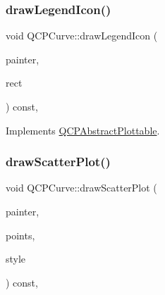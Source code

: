 \mbox{\label{class_q_c_p_curve_aac6e94afbce4002d2cd7793250154e84}} 
\subsubsection{\texorpdfstring{drawLegendIcon()}{drawLegendIcon()}}
{\footnotesize\ttfamily void Q\+C\+P\+Curve\+::draw\+Legend\+Icon (\begin{DoxyParamCaption}\item[{\mbox{\hyperlink{class_q_c_p_painter}{Q\+C\+P\+Painter}} $\ast$}]{painter,  }\item[{const Q\+RectF \&}]{rect }\end{DoxyParamCaption}) const\hspace{0.3cm}{\ttfamily [protected]}, {\ttfamily [virtual]}}



Implements \mbox{\hyperlink{class_q_c_p_abstract_plottable_a9a450783fd9ed539e589999fd390cdf7}{Q\+C\+P\+Abstract\+Plottable}}.

\mbox{\label{class_q_c_p_curve_a0bea811373c5ee8c67c9c2b4d74ad866}} 
\subsubsection{\texorpdfstring{drawScatterPlot()}{drawScatterPlot()}}
{\footnotesize\ttfamily void Q\+C\+P\+Curve\+::draw\+Scatter\+Plot (\begin{DoxyParamCaption}\item[{\mbox{\hyperlink{class_q_c_p_painter}{Q\+C\+P\+Painter}} $\ast$}]{painter,  }\item[{const Q\+Vector$<$ Q\+PointF $>$ \&}]{points,  }\item[{const \mbox{\hyperlink{class_q_c_p_scatter_style}{Q\+C\+P\+Scatter\+Style}} \&}]{style }\end{DoxyParamCaption}) const\hspace{0.3cm}{\ttfamily [protected]}, {\ttfamily [virtual]}}

\mbox{\label{class_q_c_p_curve_aefca1e5127fae2d7ff65b9e921637c58}} 

